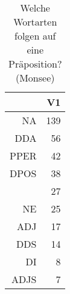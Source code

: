 \begin{table}[ht]
\centering
\begin{tabular}{rr}
  \hline
 & V1 \\ 
  \hline
NA & 139 \\ 
  DDA &  56 \\ 
  PPER &  42 \\ 
  DPOS &  38 \\ 
   &  27 \\ 
  NE &  25 \\ 
  ADJ &  17 \\ 
  DDS &  14 \\ 
  DI &   8 \\ 
  ADJS &   7 \\ 
   \hline
\end{tabular}
\caption{Welche Wortarten folgen auf eine Präposition?  (Monsee)} 
\end{table}

